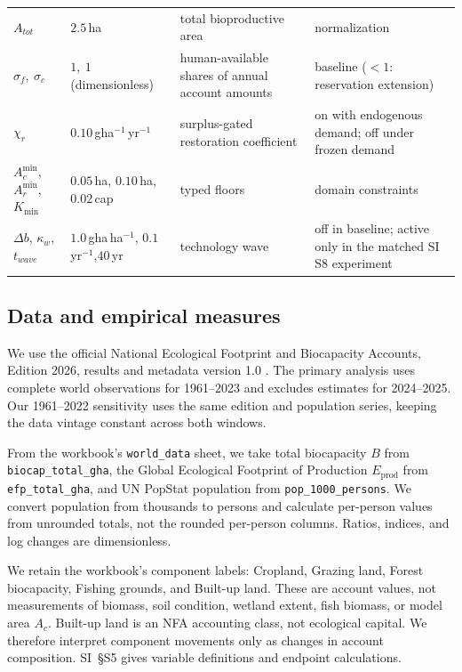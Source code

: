 \documentclass[preprint,12pt,authoryear]{elsarticle}
\newcommand{\Acmin}{A_c^{\min}}
\begin{document}
\begin{table}[!htbp]
\begin{tabularx}{\textwidth}{@{}>{\raggedright\arraybackslash}p{} >{\raggedright\arraybackslash}p{} >{\raggedright\arraybackslash}X >{\raggedright\arraybackslash}p{}@{}}
$A_{tot}$ & $2.5$\,ha & total bioproductive area & normalization \\
$\sigma_f,\ \sigma_c$ & $1,\ 1$ (dimensionless) & human-available shares of annual account amounts & baseline ($<1$: reservation extension) \\
$\chi_r$ & $0.10$\,gha$^{-1}$\,yr$^{-1}$ & surplus-gated restoration coefficient & on with endogenous demand; off under frozen demand \\
$\Acmin$, $A_r^{\min}$,\newline $K_{\min}$ & $0.05$\,ha, $0.10$\,ha,\newline $0.02$\,cap & typed floors & domain constraints \\
$\Delta b$, $\kappa_w$,\newline $t_{wave}$ & $1.0$\,gha\,ha$^{-1}$, $0.1$\,yr$^{-1}$,\newline $40$\,yr & technology wave & off in baseline; active only in the matched SI S8 experiment \\
\bottomrule
\end{tabularx}
\end{table}

\subsection{Data and empirical measures}\label{sec:data}

We use the official National Ecological Footprint and Biocapacity Accounts, Edition 2026, results and metadata version 1.0 \citep{Lo2026NFA}. The primary analysis uses complete world observations for 1961--2023 and excludes estimates for 2024--2025. Our 1961--2022 sensitivity uses the same edition and population series, keeping the data vintage constant across both windows.

From the workbook's \texttt{world\_data} sheet, we take total biocapacity $B$ from \texttt{biocap\_total\_gha}, the Global Ecological Footprint of Production $E_{\mathrm{prod}}$ from \texttt{efp\_total\_gha}, and UN PopStat population from \texttt{pop\_1000\_persons}. We convert population from thousands to persons and calculate per-person values from unrounded totals, not the rounded per-person columns. Ratios, indices, and log changes are dimensionless.

We retain the workbook's component labels: Cropland, Grazing land, Forest biocapacity, Fishing grounds, and Built-up land. These are account values, not measurements of biomass, soil condition, wetland extent, fish biomass, or model area $A_c$. Built-up land is an NFA accounting class, not ecological capital. We therefore interpret component movements only as changes in account composition. SI~\S S5 gives variable definitions and endpoint calculations.
\end{document}
